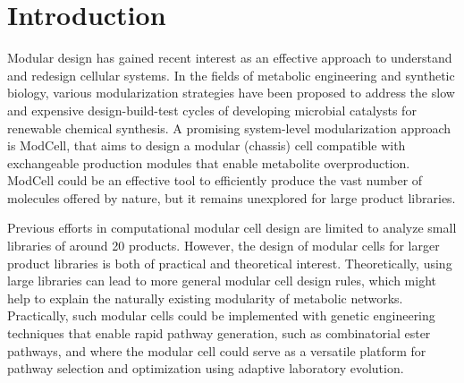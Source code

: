 \section{Introduction}
Modular design has gained recent interest as an effective approach to understand and redesign cellular systems. \citep{garcia2019b}
In the fields of metabolic engineering and synthetic biology, various modularization strategies\citep{biggs2014,trinh2015,garcia2019,garcia2019c,garcia2019d} have been proposed to address the slow and expensive design-build-test cycles of developing microbial catalysts for renewable chemical synthesis.\citep{nielsen2016}
A promising system-level modularization\citep{purnick2009} approach is ModCell,\citep{garcia2019} that aims to design a modular (chassis) cell compatible with exchangeable production modules that enable metabolite overproduction.
ModCell could be an effective tool to efficiently produce the vast number of molecules offered by nature,\citep{trinh2016, lee2019}
but it remains unexplored for large product libraries.


Previous efforts in computational modular cell design are limited to analyze small libraries of around 20 products.\citep{garcia2019,garcia2019d}
However, the design of modular cells for larger product libraries is both of practical and theoretical interest.
Theoretically, using large libraries can lead to more general modular cell design rules, which might help to explain the naturally existing modularity of metabolic networks.\citep{garcia2019b}
Practically, such modular cells could be implemented with genetic engineering techniques that enable rapid pathway generation, such as combinatorial ester pathways,\citep{layton2014} and where the modular cell could serve as a versatile platform for pathway selection and optimization using adaptive laboratory evolution.\citep{wilbanks2017}


